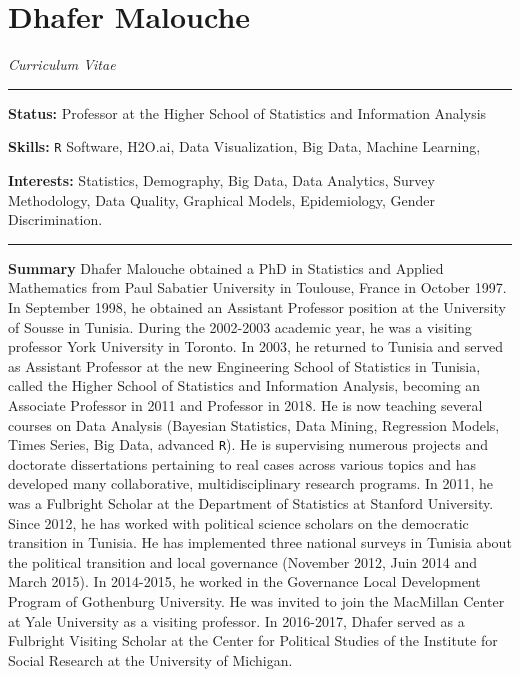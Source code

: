 \documentclass[]{article}
\title{}
\author{}
\date{}
\begin{document}
\section{Dhafer Malouche}\label{dhafer-malouche}

\emph{Curriculum Vitae}

\begin{center}\rule{0.5\linewidth}{\linethickness}\end{center}

\textbf{Status:} Professor at the Higher School of Statistics and
Information Analysis

\textbf{Skills:} \texttt{R} Software, H2O.ai, Data Visualization, Big
Data, Machine Learning,

\textbf{Interests:} Statistics, Demography, Big Data, Data Analytics,
Survey Methodology, Data Quality, Graphical Models, Epidemiology, Gender
Discrimination.

\begin{center}\rule{0.5\linewidth}{\linethickness}\end{center}

\textbf{Summary} Dhafer Malouche obtained a PhD in Statistics and
Applied Mathematics from Paul Sabatier University in Toulouse, France in
October 1997. In September 1998, he obtained an Assistant Professor
position at the University of Sousse in Tunisia. During the 2002-2003
academic year, he was a visiting professor York University in Toronto.
In 2003, he returned to Tunisia and served as Assistant Professor at the
new Engineering School of Statistics in Tunisia, called the Higher
School of Statistics and Information Analysis, becoming an Associate
Professor in 2011 and Professor in 2018. He is now teaching several
courses on Data Analysis (Bayesian Statistics, Data Mining, Regression
Models, Times Series, Big Data, advanced \texttt{R}). He is supervising
numerous projects and doctorate dissertations pertaining to real cases
across various topics and has developed many collaborative,
multidisciplinary research programs. In 2011, he was a Fulbright Scholar
at the Department of Statistics at Stanford University. Since 2012, he
has worked with political science scholars on the democratic transition
in Tunisia. He has implemented three national surveys in Tunisia about
the political transition and local governance (November 2012, Juin 2014
and March 2015). In 2014-2015, he worked in the Governance Local
Development Program of Gothenburg University. He was invited to join the
MacMillan Center at Yale University as a visiting professor. In
2016-2017, Dhafer served as a Fulbright Visiting Scholar at the Center
for Political Studies of the Institute for Social Research at the
University of Michigan.
\end{document}
